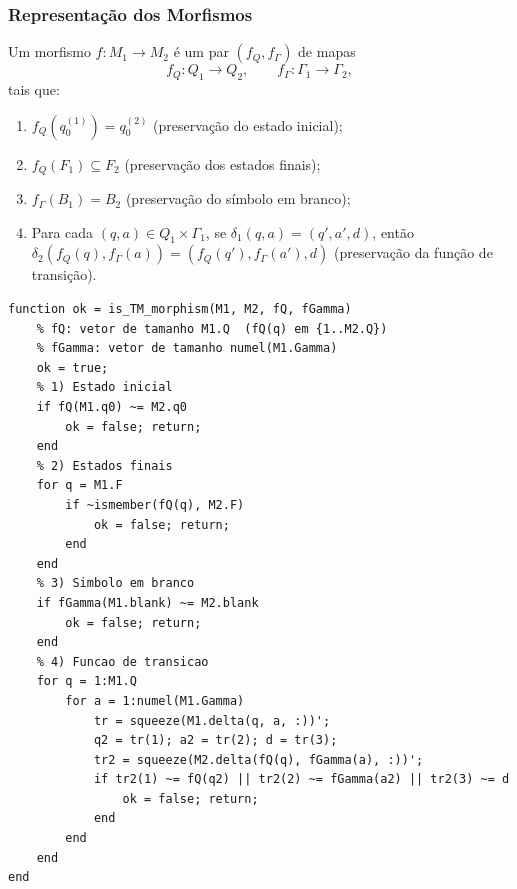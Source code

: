 \subsubsection{Representação dos Morfismos}

\begin{definition}
Um morfismo $f: M_1 \to M_2$ é um par $(f_Q, f_\Gamma)$ de mapas
\[
f_Q: Q_1 \to Q_2, \qquad f_\Gamma: \Gamma_1 \to \Gamma_2,
\]
tais que:
\begin{enumerate}
    \item $f_Q(q_0^{(1)}) = q_0^{(2)}$ (preservação do estado inicial);
    \item $f_Q(F_1) \subseteq F_2$ (preservação dos estados finais);
    \item $f_\Gamma(B_1) = B_2$ (preservação do símbolo em branco);
    \item Para cada $(q, a) \in Q_1 \times \Gamma_1$, se $\delta_1(q, a) = (q', a', d)$, então $\delta_2(f_Q(q), f_\Gamma(a)) = (f_Q(q'), f_\Gamma(a'), d)$ (preservação da função de transição).
\end{enumerate}
\end{definition}

\begin{lstlisting}[style=matlab, caption={Verificação de um morfismo de Máquinas de Turing}]
function ok = is_TM_morphism(M1, M2, fQ, fGamma)
    % fQ: vetor de tamanho M1.Q  (fQ(q) em {1..M2.Q})
    % fGamma: vetor de tamanho numel(M1.Gamma)
    ok = true;
    % 1) Estado inicial
    if fQ(M1.q0) ~= M2.q0
        ok = false; return;
    end
    % 2) Estados finais
    for q = M1.F
        if ~ismember(fQ(q), M2.F)
            ok = false; return;
        end
    end
    % 3) Simbolo em branco
    if fGamma(M1.blank) ~= M2.blank
        ok = false; return;
    end
    % 4) Funcao de transicao
    for q = 1:M1.Q
        for a = 1:numel(M1.Gamma)
            tr = squeeze(M1.delta(q, a, :))';
            q2 = tr(1); a2 = tr(2); d = tr(3);
            tr2 = squeeze(M2.delta(fQ(q), fGamma(a), :))';
            if tr2(1) ~= fQ(q2) || tr2(2) ~= fGamma(a2) || tr2(3) ~= d
                ok = false; return;
            end
        end
    end
end
\end{lstlisting}